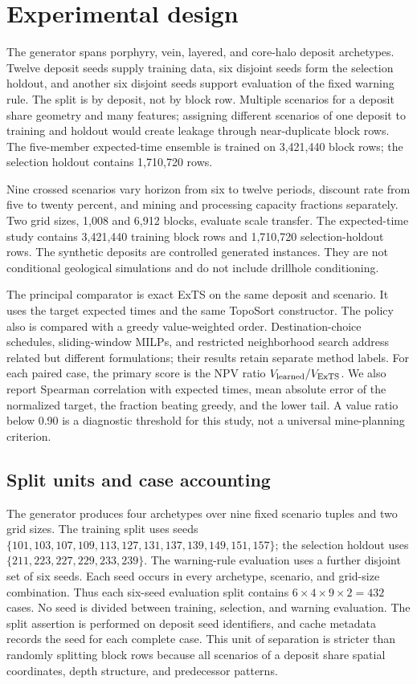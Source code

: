 \documentclass[11pt]{article}
\begin{document}
\section{Experimental design}
The generator spans porphyry, vein, layered, and core-halo deposit archetypes. Twelve deposit seeds supply training data, six disjoint seeds form the selection holdout, and another six disjoint seeds support evaluation of the fixed warning rule. The split is by deposit, not by block row. Multiple scenarios for a deposit share geometry and many features; assigning different scenarios of one deposit to training and holdout would create leakage through near-duplicate block rows. The five-member expected-time ensemble is trained on 3,421,440 block rows; the selection holdout contains 1,710,720 rows.

Nine crossed scenarios vary horizon from six to twelve periods, discount rate from five to twenty percent, and mining and processing capacity fractions separately. Two grid sizes, 1,008 and 6,912 blocks, evaluate scale transfer. The expected-time study contains 3,421,440 training block rows and 1,710,720 selection-holdout rows. The synthetic deposits are controlled generated instances. They are not conditional geological simulations and do not include drillhole conditioning.

The principal comparator is exact ExTS on the same deposit and scenario. It uses the target expected times and the same TopoSort constructor. The policy also is compared with a greedy value-weighted order. Destination-choice schedules, sliding-window MILPs, and restricted neighborhood search address related but different formulations; their results retain separate method labels. For each paired case, the primary score is the NPV ratio $V_{\rm learned}/V_{\rm ExTS}$. We also report Spearman correlation with expected times, mean absolute error of the normalized target, the fraction beating greedy, and the lower tail. A value ratio below 0.90 is a diagnostic threshold for this study, not a universal mine-planning criterion.

\subsection{Split units and case accounting}
The generator produces four archetypes over nine fixed scenario tuples and two grid sizes. The training split uses seeds $\{101,103,107,109,113,127,131,137,139,149,151,157\}$; the selection holdout uses $\{211,223,227,229,233,239\}$. The warning-rule evaluation uses a further disjoint set of six seeds. Each seed occurs in every archetype, scenario, and grid-size combination. Thus each six-seed evaluation split contains $6\times4\times9\times2=432$ cases. No seed is divided between training, selection, and warning evaluation. The split assertion is performed on deposit seed identifiers, and cache metadata records the seed for each complete case. This unit of separation is stricter than randomly splitting block rows because all scenarios of a deposit share spatial coordinates, depth structure, and predecessor patterns.
\end{document}
